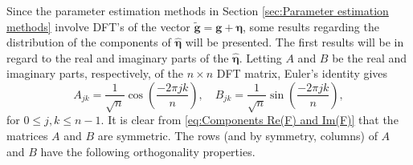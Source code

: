 \documentclass[12pt]{article}
\newcommand{\gdis}{\mathbf{g}}
\newcommand{\gnoise}{\widetilde{\mathbf{g}}}
\newcommand{\noise}{\bm{\eta}}	%
\begin{document}
Since the parameter estimation methods in Section \ref{sec:Parameter estimation methods} involve DFT's of the vector $\gnoise = \gdis + \noise$, some results regarding the distribution of the components of $\widehat{\noise}$ will be presented. The first results will be in regard to the real and imaginary parts of the $\widehat{\noise}$. Letting $A$ and $B$ be the real and imaginary parts, respectively, of the $n \times n$ DFT matrix, Euler's identity gives
\begin{equation}
A_{jk} = \frac{1}{\sqrt{n}}\cos\left(\frac{-2\pi{jk}}{n}\right), \quad B_{jk} = \frac{1}{\sqrt{n}}\sin\left(\frac{-2\pi{jk}}{n}\right),
\label{eq:Components Re(F) and Im(F)}
\end{equation}
for $0 \leq j,k \leq n-1$. It is clear from \eqref{eq:Components Re(F) and Im(F)} that the matrices $A$ and $B$ are symmetric. The rows (and by symmetry, columns) of $A$ and $B$ have the following orthogonality properties.
\end{document}
